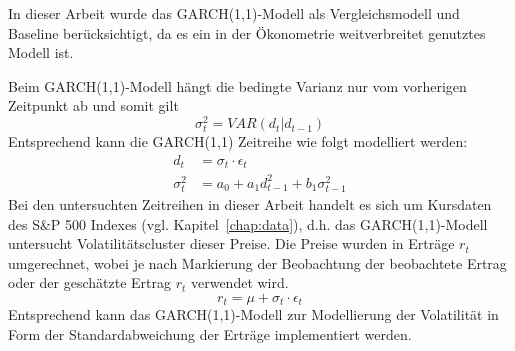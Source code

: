 \documentclass[ngerman]{ttlab-qualify}
\begin{document}
In dieser Arbeit wurde das GARCH(1,1)-Modell als Vergleichsmodell und Baseline berücksichtigt, da es ein in der Ökonometrie weitverbreitet genutztes Modell ist.

Beim GARCH(1,1)-Modell hängt die bedingte Varianz nur vom vorherigen Zeitpunkt ab und somit gilt 
\[\sigma_t^2 = VAR(d_t|d_{t-1})\]
Entsprechend kann die GARCH(1,1) Zeitreihe wie folgt modelliert werden:
\begin{align}
d_t &= \sigma_t\cdot \epsilon_t \nonumber \\
\sigma_t^2 &= a_0 + a_1d_{t-1}^2 + b_1\sigma_{t-1}^2
\end{align} 
Bei den untersuchten Zeitreihen in dieser Arbeit handelt es sich um Kursdaten des S\&P 500 Indexes (vgl. Kapitel~\ref{chap:data}), d.h. das GARCH(1,1)-Modell untersucht Volatilitätscluster dieser Preise. Die Preise wurden in Erträge $r_t$ umgerechnet, wobei je nach Markierung der Beobachtung der beobachtete Ertrag oder der geschätzte Ertrag $r_t$ verwendet wird.
\[r_t = \mu +\sigma_t\cdot \epsilon_t\]
Entsprechend kann das GARCH(1,1)-Modell zur Modellierung der Volatilität in Form der Standardabweichung der Erträge implementiert werden.
\end{document}
